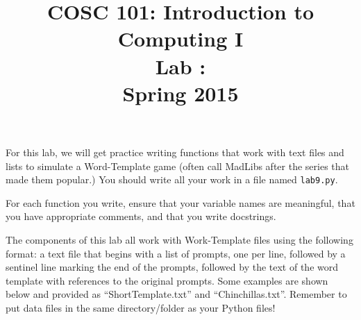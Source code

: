 \documentclass[10pt,answers]{exam}
\date{}
\author{}
\title{COSC 101: Introduction to Computing I\\ 
Lab \labnumber: \labname\\
Spring 2015}
\begin{document}
\maketitle

For this lab, we will get practice writing functions that work with text 
files and lists to simulate a Word-Template game (often call MadLibs after 
the series that made them popular.)  You should write all your work in a file 
named \lstinline{lab9.py}.

For each function you write, ensure that your variable names are meaningful, 
that you have appropriate comments, and that you write docstrings.

The components of this lab all work with Work-Template files using the 
following format: a text file that begins with a list of prompts, one per 
line, followed by a sentinel line marking the end of the prompts, followed 
by the text of the word template with references to the original prompts.
Some examples are shown below and provided as ``ShortTemplate.txt'' and ``Chinchillas.txt''.  
Remember to put data files in the same directory/folder as your Python files!




\end{document}
